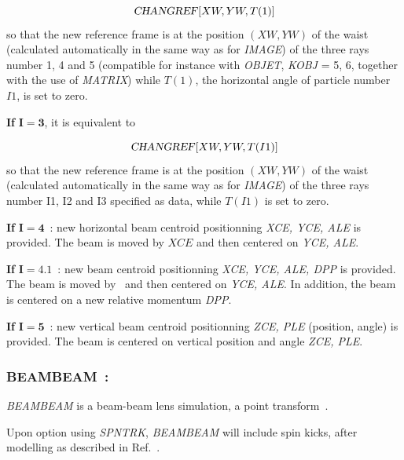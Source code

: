 $$ \text{\textsl{CHANGREF}} \lbrack XW, YW, T(1)\rbrack $$
%
 so that the new reference frame is at the position $ (XW, YW) $ of
the waist (calculated automatically in the same way as for 
\textsl{IMAGE}) of the three rays number 1, 4 and 5 (compatible for instance
with \textsl{OBJET}, \textsl{KOBJ}  =  5, 6,  together with the 
use of \textsl{MATRIX}) while $T(1)$, the horizontal angle of particle number $I1$,  is set to zero.  

\bigskip

\noindent\textbf{If} $\mathbf{I=3}$,  it is equivalent to 

$$\text{\textsl{CHANGREF}} \lbrack XW,YW,T(I1)\rbrack $$
%
 so that the new reference frame is at the position $ (XW, YW) $ of
the waist (calculated automatically in the same way as for 
\textsl{IMAGE}) of the three rays number I1, I2 and I3 specified as data,  while $T(I1)$ is set to zero.
 

\bigskip

\noindent\textbf{If} $\mathbf{I=4}$~: new horizontal beam centroid positionning \textsl{XCE, YCE, ALE} is provided.  
 The beam is moved by $XCE$ and then centered on \textsl{YCE, ALE}. 
 
\bigskip

\noindent\textbf{If} $\mathbf{I=4.1}$~: new  beam centroid positionning \textsl{XCE, YCE, ALE, DPP} is provided. 
 The beam is moved by \XCE\ and then centered on \textsl{YCE, ALE}. 
In addition, the beam is centered on a new relative momentum \textsl{DPP}. 

\bigskip

\noindent\textbf{If} $\mathbf{I=5}$~: new vertical beam centroid positionning \textsl{ZCE, PLE} (position, angle) is provided.  
 The beam is centered on vertical position and angle \textsl{ZCE, PLE}. 
 
 


\newpage


\subsubsection*{BEAMBEAM~: \BEAMBEAMTitl}\label{BEAMBEAM}  
  
\medskip

\textsl{BEAMBEAM} is a beam-beam lens simulation, a point transform~\cite{BBSW}. 

\medskip 

\noindent Upon option using \textsl{SPNTRK}, 
\textsl{BEAMBEAM} will include spin kicks, after  modelling as described in Ref.~\cite{YKBatyginSpin}. 



